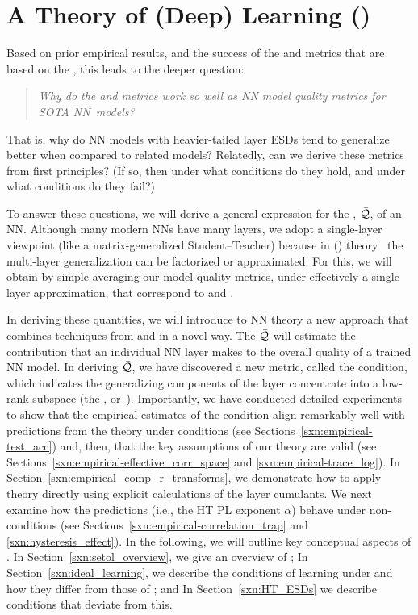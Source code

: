 \section{A \SemiEmpirical Theory of (Deep) Learning (\SETOL)}
\label{sxn:setol}
Based on prior empirical results, and the success of the \ALPHA and \ALPHAHAT metrics that are based on the \HTSR \Phenomenology, this leads to the deeper question: 
%
\begin{quote}
\emph{Why do the \ALPHA and \ALPHAHAT metrics work so well as NN model quality metrics for SOTA NN~models?}
\end{quote}
That is, why do NN models with heavier-tailed layer ESDs tend to generalize better when compared to related models?
Relatedly, can we derive these metrics from first principles?
(If so, then under what conditions do they hold, and under what conditions do they fail?)


\noindent
To answer these questions, we will derive a general expression for the \LayerQuality, $\bar{\mathcal{Q}}$, of an NN.
Although many modern NNs have many layers, we adopt a single-layer viewpoint (like a matrix-generalized Student–Teacher) because in \StatisticalMechanicsOfGeneralization (\SMOG) theory~\cite{SST92,STS90} the multi-layer generalization can be factorized or approximated.
For this, we will obtain by simple averaging our model quality metrics, under effectively a single layer approximation, that correspond to \ALPHA and \ALPHAHAT.


In deriving these quantities, we will introduce to NN theory a new \SemiEmpirical approach that combines techniques from \STATMECH and \RMT in a novel way.
The \LayerQuality $\bar{\mathcal{Q}}$ will estimate the contribution that an individual NN layer makes to the overall quality of a trained NN model.
In deriving $\bar{\mathcal{Q}}$, we have discovered a new \LayerQuality metric, called the \TRACELOG condition,
which indicates the generalizing components of the layer concentrate into a low-rank subspace
(the \emph{\EffectiveCorrelationSpace}, or~\ECS).
Importantly, we have conducted detailed experiments to show 
that the empirical estimates of the \SETOL \TRACELOG condition align remarkably well with predictions from the \HTSR
theory under \Ideal conditions (see Sections~\ref{sxn:empirical-test_acc})
and, then, 
that the key assumptions of our \SETOL theory are valid
(see Sections~\ref{sxn:empirical-effective_corr_space} and \ref{sxn:empirical-trace_log}).
In Section~\ref{sxn:empirical_comp_r_transforms}, we demonstrate how to apply theory directly using explicit calculations of the \RMT layer cumulants.
We next examine how the \HTSR predictions (i.e., the HT PL exponent $\alpha$) behave under non-\Ideal conditions (see Sections~\ref{sxn:empirical-correlation_trap} and \ref{sxn:hysteresis_effect}).
%
In the following, we will outline key conceptual aspects of \SETOL.
In Section~\ref{sxn:setol_overview}, we give an overview of \SETOL;
In Section~\ref{sxn:ideal_learning}, we describe the conditions of \Ideal learning under \SETOL and how they differ from those of \HTSR; and
In Section~\ref{sxn:HT_ESDs} we describe conditions that deviate from this.






